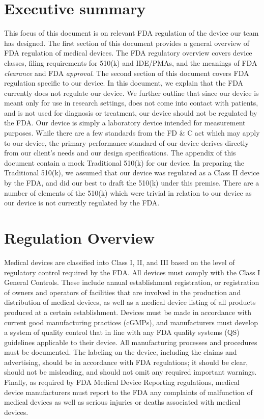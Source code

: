 \documentclass{article}
\begin{document}

\setcounter{tocdepth}{3}
\tableofcontents
\newpage

\section*{Executive summary}
\label{sec:exec-summary}
This focus of this document is on relevant FDA regulation of the
device our team has designed. The first section of this document
provides a general overview of FDA regulation of medical devices. The
FDA regulatory overview covers device classes, filing requirements for
510(k) and IDE/PMAs, and the meanings of FDA \textit{clearance} and
FDA \textit{approval}. The second section of this document covers FDA
regulation specific to our device. In this document, we explain that
the FDA currently does not regulate our device. We further outline
that since our device is meant only for use in research settings, does
not come into contact with patients, and is not used for diagnosis or
treatment, our device should not be regulated by the FDA. Our device
is simply a laboratory device intended for measurement purposes. While
there are a few standards from the FD \& C act which may apply to our
device, the primary performance standard of our device derives
directly from our client's needs and our design specifications. The
appendix of this document contain a mock Traditional 510(k) for our
device. In preparing the Traditional 510(k), we assumed that our
device was regulated as a Class II device by the FDA, and did our best
to draft the 510(k) under this premise. There are a number of elements
of the 510(k) which were trivial in relation to our device as our
device is not currently regulated by the FDA. 

\newpage
\section{Regulation Overview}
\label{sec:test-administration}

Medical devices are classified into Class I, II, and III based on the
level of regulatory control required by the FDA. All devices must
comply with the Class I General Controls. These include annual
establishment registration, or registration of owners and operators of
facilities that are involved in the production and distribution of
medical devices, as well as a medical device listing of all products
produced at a certain establishment. Devices must be made in
accordance with current good manufacturing practices (cGMPs), and
manufacturers must develop a system of quality control that in line
with any FDA quality systems (QS) guidelines applicable to their
device. All manufacturing processes and procedures must be
documented. The labeling on the device, including the claims and
advertising, should be in accordance with FDA regulations; it should
be clear, should not be misleading, and should not omit any required
important warnings. Finally, as required by FDA Medical Device
Reporting regulations, medical device manufacturers must report to the
FDA any complaints of malfunction of medical devices as well as
serious injuries or deaths associated with medical devices.
\end{document}
